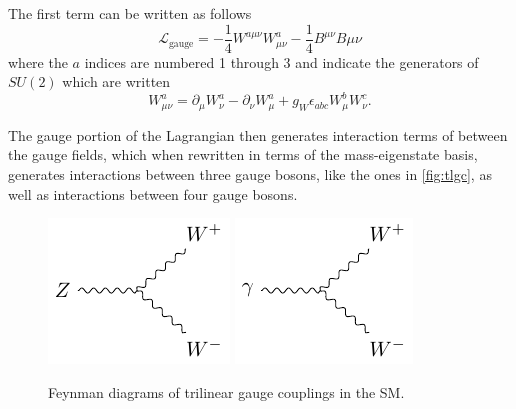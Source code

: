 The first term can be written as follows
%
\begin{equation}
\mathcal{L}_\text{gauge} = -\frac{1}{4}W^{a\mu\nu}W^a_{\mu\nu} - \frac{1}{4}B^{\mu\nu}B{\mu\nu} 
\end{equation}
%
where the $a$ indices are numbered 1 through 3 and indicate the generators of $SU(2)$ which are written 
%
\begin{equation}
W^a_{\mu\nu} = \partial_\mu W^a_\nu - \partial_\nu W^a_\mu + g_W \epsilon_{abc} W^b_\mu W^c_\nu .
\end{equation}

The gauge portion of the Lagrangian then generates interaction terms of between the gauge fields, which when rewritten in terms of the mass-eigenstate basis, generates interactions between three gauge bosons, like the ones in \autoref{fig:tlgc}, as well as interactions between four gauge bosons.

\begin{centering}
\begin{figure}[!hbt]
\myfloatalign
\includegraphics[width=.45\linewidth]{feynman/tlgc_z.pdf}
\includegraphics[width=.45\linewidth]{feynman/tlgc_g.pdf}
\caption{Feynman diagrams of trilinear gauge couplings in the \ac{SM}.}
\label{fig:tlgc}
\end{figure}
\end{centering}

